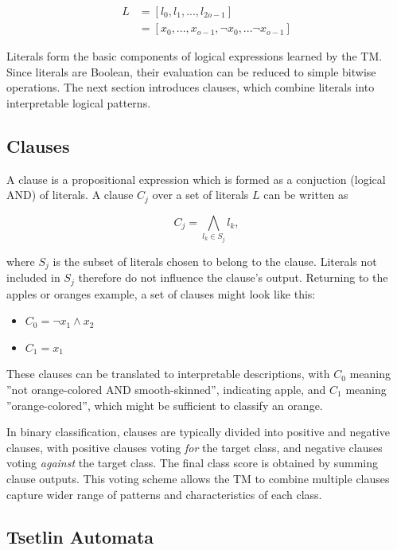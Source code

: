 \begin{align}
\label{eq:literalvec}
    L &= [l_0, l_1, ..., l_{2o-1}] \\
      &= [x_0, ..., x_{o-1}, \neg x_0, ... \neg x_{o-1}]
\end{align}

Literals form the basic components of logical expressions learned by the TM. Since literals are Boolean, their evaluation can be reduced to simple bitwise operations. The next section introduces clauses, which combine literals into interpretable logical patterns.

\subsection{Clauses}
\label{sec:clauses}
A clause is a propositional expression which is formed as a conjuction (logical AND) of literals. A clause $C_j$ over a set of literals $L$ can be written as 

\begin{equation}
\label{eq:clause}
    C_j = \bigwedge\limits_{l_k \in S_j} l_k,
\end{equation}

where $S_j$ is the subset of literals chosen to belong to the clause. Literals not included in $S_j$ therefore do not influence the clause's output. Returning to the apples or oranges example, a set of clauses might look like this:

\begin{itemize}
    \item $C_0 = \neg x_1 \wedge x_2$
    \item $C_1 = x_1$
\end{itemize}

These clauses can be translated to interpretable descriptions, with $C_0$ meaning ''not orange-colored AND smooth-skinned'', indicating apple, and $C_1$ meaning ''orange-colored'', which might be sufficient to classify an orange.

In binary classification, clauses are typically divided into positive and negative clauses, with positive clauses voting \textit{for} the target class, and negative clauses voting \textit{against} the target class. The final class score is obtained by summing clause outputs. This voting scheme allows the TM to combine multiple clauses capture wider range of patterns and characteristics of each class.

\subsection{Tsetlin Automata}

